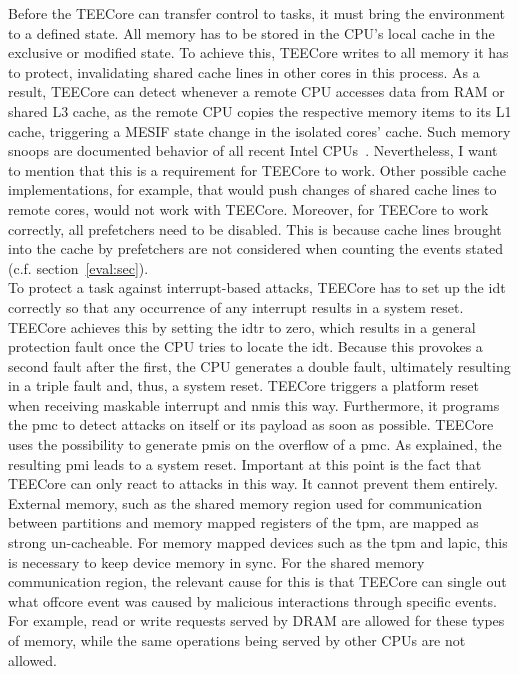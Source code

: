 Before the TEECore can transfer control to tasks, it must bring the environment
to a defined state. All memory has to be stored in the CPU's local cache in the
exclusive or modified state. To achieve this, TEECore writes to all memory it
has to protect, invalidating shared cache lines in other cores in this process.
As a result, TEECore can detect whenever a remote CPU accesses data from RAM or
shared L3 cache, as the remote CPU copies the respective memory items to its L1
cache, triggering a MESIF state change in the isolated cores' cache. Such memory
snoops are documented behavior of all recent Intel CPUs~\cite{sdm}.
Nevertheless, I want to mention that this is a requirement for TEECore to work.
Other possible cache implementations, for example, that would push changes of
shared cache lines to remote cores, would not work with TEECore. Moreover, for
TEECore to work correctly, all prefetchers need to be disabled. This is because
cache lines brought into the cache by prefetchers are not considered when
counting the events stated (c.f. section~\ref{eval:sec}).\\

To protect a task against interrupt-based attacks, TEECore has to set up the
\gls{idt} correctly so that any occurrence of any interrupt results in a system
reset. TEECore achieves this by setting the \gls{idtr} to zero, which results in
a general protection fault once the CPU tries to locate the \gls{idt}. Because
this provokes a second fault after the first, the CPU generates a double fault,
ultimately resulting in a triple fault and, thus, a system reset. TEECore
triggers a platform reset when receiving maskable interrupt and \glspl{nmi} this
way. Furthermore, it programs the \gls{pmc} to detect attacks on itself or its
payload as soon as possible. TEECore uses the possibility to generate
\glspl{pmi} on the overflow of a \gls{pmc}. As explained, the resulting
\gls{pmi} leads to a system reset. Important at this point is the fact that
TEECore can only react to attacks in this way. It cannot prevent them
entirely.\\

External memory, such as the shared memory region used for communication between
partitions and memory mapped registers of the \gls{tpm}, are mapped as strong
un-cacheable. For memory mapped devices such as the \gls{tpm} and \gls{lapic},
this is necessary to keep device memory in sync. For the shared memory
communication region, the relevant cause for this is that TEECore can
single out what offcore event was caused by malicious interactions through
specific events. For example, read or write requests served by DRAM are allowed
for these types of memory, while the same operations being served by other CPUs
are not allowed.\\

